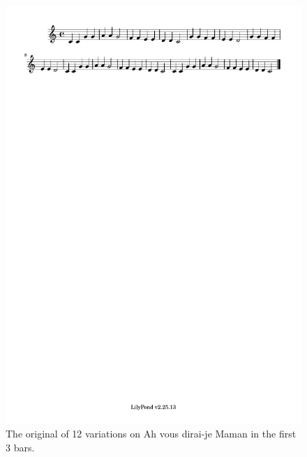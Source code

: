 \documentclass[11pt]{article}
\theoremstyle{definition}
\begin{document}
\begin{figure}
\centering
\includegraphics[trim=1cm 26.5cm 10.055cm 0.02cm, clip, scale=1]{dabby_1.pdf} %
\caption{The original of 12 variations on Ah vous dirai-je Maman in the first 3 bars.}
\label{fig:Dabby1} 
\end{figure}
\end{document}

